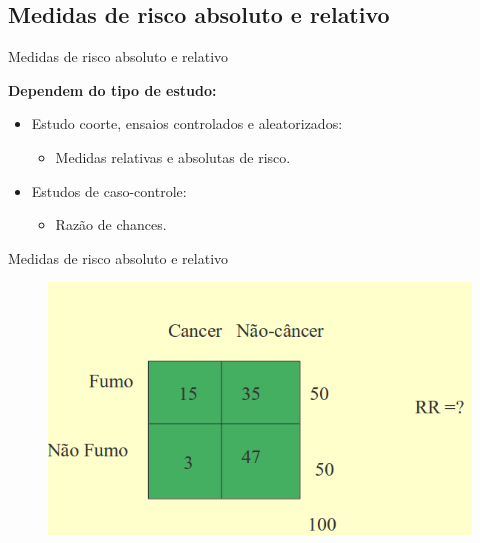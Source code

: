 \documentclass[9pt]{beamer}
\begin{document}
\subsection{Medidas de risco absoluto e relativo}
\begin{frame}{Medidas de risco absoluto e relativo}{}

\textbf{Dependem do tipo de estudo:}\\

\begin{itemize}
\item Estudo coorte, ensaios controlados e aleatorizados:
  \begin{itemize}
    \item Medidas relativas e absolutas de risco.
  \end{itemize}
  \item Estudos de caso-controle:
  \begin{itemize}
    \item Razão de chances.
  \end{itemize}
\end{itemize}
\end{frame}


\begin{frame}{Medidas de risco absoluto e relativo}{}


\begin{figure}[!htb]
    \centering
    \includegraphics[scale=0.5]{tab2.png}
\end{figure}



\end{frame}
\end{document}
